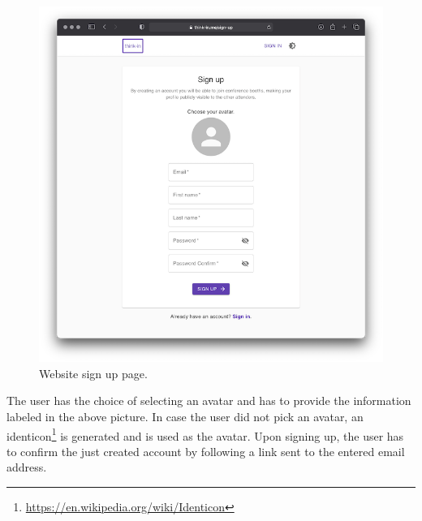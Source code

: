 \begin{figure}[H]
	\includegraphics[width=\textwidth,keepaspectratio]{images/business_logic/sign_up_page.png}
	\caption{Website sign up page.}
	\label{figure:website-sign-up-page}
\end{figure}

The user has the choice of selecting an avatar and has to provide the information labeled in the above picture. In case the user did not pick an avatar, an identicon\footnote{\href{https://en.wikipedia.org/wiki/Identicon}{https://en.wikipedia.org/wiki/Identicon}} is generated and is used as the avatar. Upon signing up, the user has to confirm the just created account by following a link sent to the entered email address.

